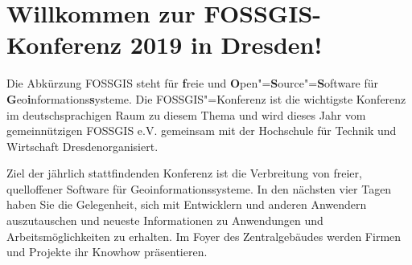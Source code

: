 \newpage
\section*{Willkommen zur FOSSGIS-Konferenz 2019 in Dresden!} \label{welcome}
Die Abkürzung { FOSSGIS} steht für {\bf f}reie und {\bf O}pen"={\bf S}ource"={\bf S}oftware für {\bf G}eo{\bf i}nformations{\bf s}ysteme.
Die FOSSGIS"=Konferenz ist die wichtigste Konferenz im deutschsprachigen Raum zu
diesem \mbox{Thema} und wird dieses Jahr vom gemeinnützigen FOSSGIS e.V.
gemeinsam mit der Hochschule für Technik und Wirtschaft Dresden\linebreak organisiert.

Ziel der jährlich stattfindenden Konferenz ist die Verbreitung von freier,
quelloffener Software für Geoinformationssysteme. In den nächsten vier Tagen
haben Sie die Gelegenheit, sich mit Entwicklern und anderen Anwendern
auszutauschen und \mbox{neueste} Informationen zu Anwendungen und
Arbeitsmöglichkeiten zu erhalten. Im Foyer des Zentralgebäudes werden Firmen
und Projekte ihr Knowhow präsentieren.

\newpage


